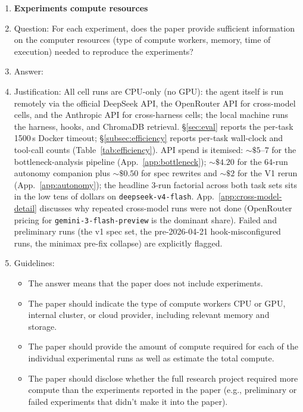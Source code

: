 \begin{enumerate}
\item {\bf Experiments compute resources}
    \item[] Question: For each experiment, does the paper provide sufficient information on the computer resources (type of compute workers, memory, time of execution) needed to reproduce the experiments?
    \item[] Answer: \answerYes{}
    \item[] Justification: All cell runs are CPU-only (no GPU): the agent itself is run remotely via the official DeepSeek API, the OpenRouter API for cross-model cells, and the Anthropic API for cross-harness cells; the local machine runs the harness, hooks, and ChromaDB retrieval. \S\ref{sec:eval} reports the per-task 1500\,s Docker timeout; \S\ref{subsec:efficiency} reports per-task wall-clock and tool-call counts (Table~\ref{tab:efficiency}). API spend is itemised: ${\sim}\$5$--$7$ for the bottleneck-analysis pipeline (App.~\ref{app:bottleneck}); ${\sim}\$4.20$ for the 64-run autonomy companion plus ${\sim}\$0.50$ for spec rewrites and ${\sim}\$2$ for the V1 rerun (App.~\ref{app:autonomy}); the headline 3-run factorial across both task sets sits in the low tens of dollars on \texttt{deepseek-v4-flash}. App.~\ref{app:cross-model-detail} discusses why repeated cross-model runs were not done (OpenRouter pricing for \texttt{gemini-3-flash-preview} is the dominant share). Failed and preliminary runs (the v1 spec set, the pre-2026-04-21 hook-misconfigured runs, the minimax pre-fix collapse) are explicitly flagged.
    \item[] Guidelines:
    \begin{itemize}
        \item The answer \answerNA{} means that the paper does not include experiments.
        \item The paper should indicate the type of compute workers CPU or GPU, internal cluster, or cloud provider, including relevant memory and storage.
        \item The paper should provide the amount of compute required for each of the individual experimental runs as well as estimate the total compute.
        \item The paper should disclose whether the full research project required more compute than the experiments reported in the paper (e.g., preliminary or failed experiments that didn't make it into the paper).
    \end{itemize}


\end{enumerate}
